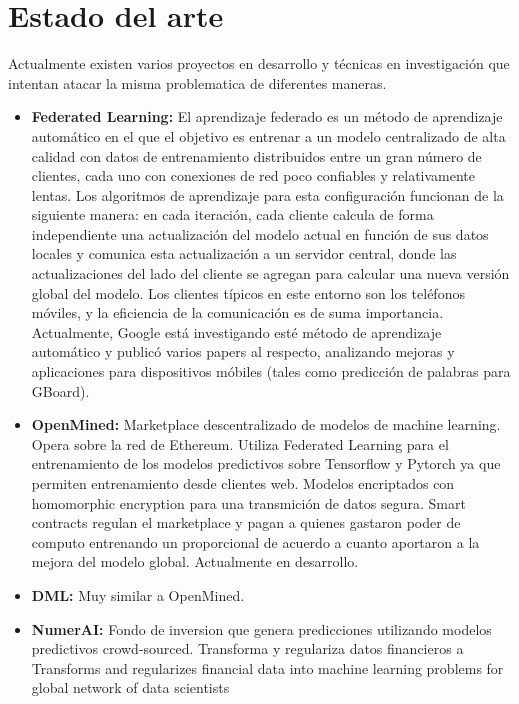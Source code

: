 \documentclass[
11pt, %
spanish, %
singlespacing, %
headsepline, %
]{MastersDoctoralThesis} %
\begin{document}
\chapter{Estado del arte}

Actualmente existen varios proyectos en desarrollo y técnicas en investigación que intentan atacar la misma problematica de diferentes maneras.

\begin{itemize}
\item \textbf{Federated Learning:} El aprendizaje federado es un método de aprendizaje automático en el que el objetivo es entrenar a un modelo centralizado de alta calidad con datos de entrenamiento distribuidos entre un gran número de clientes, cada uno con conexiones de red poco confiables y relativamente lentas. Los algoritmos de aprendizaje para esta configuración funcionan de la siguiente manera: en cada iteración, cada cliente calcula de forma independiente una actualización del modelo actual en función de sus datos locales y comunica esta actualización a un servidor central, donde las actualizaciones del lado del cliente se agregan para calcular una nueva versión global del modelo. Los clientes típicos en este entorno son los teléfonos móviles, y la eficiencia de la comunicación es de suma importancia. Actualmente, Google está investigando esté método de aprendizaje automático y publicó varios papers al respecto, analizando mejoras y aplicaciones para dispositivos móbiles (tales como predicción de palabras para GBoard).

\item \textbf{OpenMined:} Marketplace descentralizado de modelos de machine learning. Opera sobre la red de Ethereum. Utiliza Federated Learning para el entrenamiento de los modelos predictivos sobre Tensorflow y Pytorch ya que permiten entrenamiento desde clientes web. Modelos encriptados con homomorphic encryption para una transmición de datos segura. 
Smart contracts regulan el marketplace y pagan a quienes gastaron poder de computo entrenando un proporcional de acuerdo a cuanto aportaron a la mejora del modelo global.
Actualmente en desarrollo.

\item \textbf{DML:} Muy similar a OpenMined.

\item \textbf{NumerAI:} Fondo de inversion que genera predicciones utilizando modelos predictivos crowd-sourced. Transforma y regulariza datos financieros a  Transforms and regularizes financial data into machine learning problems for global network of data scientists




\end{itemize}
\end{document}
